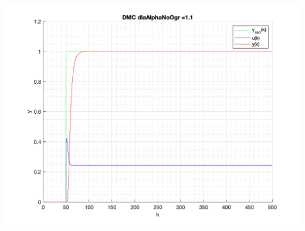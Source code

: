 \documentclass[a4paper, 11pt]{article}
\begin{document}
\begin{enumerate}
 \includegraphics[width=\linewidth]{./ModelsDodatkowe_AlphaNoOgr/P4_DMC_AlphaNoOgr_1_1_png.png} 
 

\end{enumerate}
\end{document}
